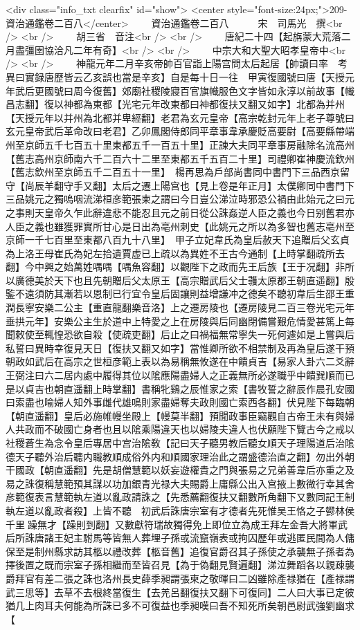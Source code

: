 <div class="info_txt clearfix" id="show">
<center style="font-size:24px;">209-資治通鑑卷二百八</center>
  　　資治通鑑卷二百八　　　宋　司馬光　撰<br />
<br />
　　胡三省　音注<br />
<br />
　　唐紀二十四【起旃蒙大荒落二月盡彊圉協洽凡二年有奇】<br />
<br />
　　中宗大和大聖大昭孝皇帝中<br />
<br />
　　神龍元年二月辛亥帝帥百官詣上陽宫問太后起居【帥讀曰率　考異曰實録唐歷皆云乙亥誤也當是辛亥】自是每十日一往　甲寅復國號曰唐【天授元年武后更國號曰周今復舊】郊廟社稷陵寢百官旗幟服色文字皆如永淳以前故事【幟昌志翻】復以神都為東都【光宅元年改東都曰神都復扶又翻又如字】北都為并州【天授元年以并州為北都并卑經翻】老君為玄元皇帝【高宗乾封元年上老子尊號曰玄元皇帝武后革命改曰老君】乙卯鳳閣侍郎同平章事韋承慶貶高要尉【高要縣帶端州至京師五千七百五十里東都五千一百五十里】正諫大夫同平章事房融除名流高州【舊志高州京師南六千二百六十二里至東都五千五百二十里】司禮卿崔神慶流欽州【舊志欽州至京師五千二百五十一里】　楊再思為戶部尚書同中書門下三品西京留守【尚辰羊翻守手又翻】太后之遷上陽宫也【見上卷是年正月】太僕卿同中書門下三品姚元之獨嗚咽流涕桓彦範張柬之謂曰今日豈公涕泣時邪恐公禍由此始元之曰元之事則天皇帝久乍此辭違悲不能忍且元之前日從公誅姦逆人臣之義也今日别舊君亦人臣之義也雖獲罪實所甘心是日出為亳州刺史【此姚元之所以為多智也舊志亳州至京師一千七百里至東都八百九十八里】　甲子立妃韋氏為皇后赦天下追贈后父玄貞為上洛王母崔氏為妃左拾遺賈虚已上疏以為異姓不王古今通制【上時掌翻疏所去翻】今中興之始萬姓喁喁【喁魚容翻】以觀陛下之政而先王后族【王于况翻】非所以廣德美於天下也且先朝贈后父太原王【高宗贈武后父士彠太原郡王朝直遥翻】殷鍳不遠須防其漸若以恩制已行宜令皇后固讓則益增謙冲之德矣不聽初韋后生邵王重潤長寧安樂二公主【重直龍翻樂音洛】上之遷房陵也【遷房陵見二百三卷光宅元年垂拱元年】安樂公主生於道中上特愛之上在房陵與后同幽閉備嘗艱危情愛甚篤上每聞敕使至輒惶恐欲自殺【使疏吏翻】后止之曰禍福無常寧失一死何遽如是上嘗與后私誓曰異時幸復見天日【復扶又翻又如字】當惟卿所欲不相禁制及再為皇后遂干預朝政如武后在高宗之世桓彦範上表以為易稱無攸遂在中饋貞吉【易家人卦六二爻辭王弼注曰六二居内處中履得其位以隂應陽盡婦人之正義無所必遂職乎中饋巽順而已是以貞吉也朝直遥翻上時掌翻】書稱牝鷄之辰惟家之索【書牧誓之辭辰作晨孔安國曰索盡也喻婦人知外事雌代雄鳴則家盡婦奪夫政則國亡索西各翻】伏見陛下每臨朝【朝直遥翻】皇后必施帷幔坐殿上【幔莫半翻】預聞政事臣竊觀自古帝王未有與婦人共政而不破國亡身者也且以隂乘陽違天也以婦陵夫違人也伏願陛下覽古今之戒以社稷蒼生為念令皇后專居中宫治隂敎【記曰天子聽男教后聽女順天子理陽道后治隂德天子聽外治后聽内職教順成俗外内和順國家理治此之謂盛德治直之翻】勿出外朝干國政【朝直遥翻】先是胡僧慧範以妖妄遊權貴之門與張易之兄弟善韋后亦重之及易之誅復稱慧範預其謀以功加銀青光禄大夫賜爵上庸縣公出入宫掖上數微行幸其舍彦範復表言慧範執左道以亂政請誅之【先悉薦翻復扶又翻數所角翻下又數同記王制執左道以亂政者殺】上皆不聽　初武后誅唐宗室有才德者先死惟吴王恪之子鬰林侯千里躁無才【躁則到翻】又數獻符瑞故獨得免上即位立為成王拜左金吾大將軍武后所誅唐諸王妃主駙馬等皆無人葬埋子孫或流竄嶺表或拘囚歷年或逃匿民間為人傭保至是制州縣求訪其柩以禮改葬【柩音舊】追復官爵召其子孫使之承襲無子孫者為擇後置之既而宗室子孫相繼而至皆召見【為于偽翻見賢遍翻】涕泣舞蹈各以親疎襲爵拜官有差二張之誅也洛州長史薛季昶謂張柬之敬暉曰二凶雖除產禄猶在【產禄謂武三思等】去草不去根終當復生【去羌呂翻復扶又翻下可復同】二人曰大事已定彼猶几上肉耳夫何能為所誅已多不可復益也季昶嘆曰吾不知死所矣朝邑尉武強劉幽求【